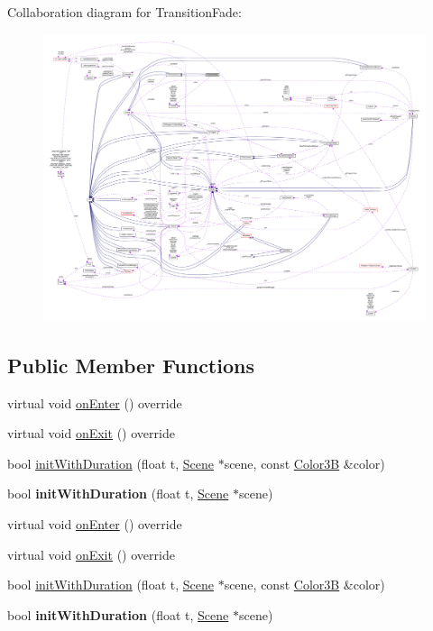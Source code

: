 Collaboration diagram for Transition\+Fade\+:
\nopagebreak
\begin{figure}[H]
\begin{center}
\leavevmode
\includegraphics[width=350pt]{classTransitionFade__coll__graph}
\end{center}
\end{figure}
\subsection*{Public Member Functions}
\begin{DoxyCompactItemize}
\item 
virtual void \hyperlink{classTransitionFade_aaeb601022c4d71c24e333fe1807f88d4}{on\+Enter} () override
\item 
virtual void \hyperlink{classTransitionFade_aa476da6459ad94c3fb3254a261fe3161}{on\+Exit} () override
\item 
bool \hyperlink{classTransitionFade_ac2caf085c6ebb62005f7c87a15f0920f}{init\+With\+Duration} (float t, \hyperlink{classScene}{Scene} $\ast$scene, const \hyperlink{structColor3B}{Color3B} \&color)
\item 
\mbox{\label{classTransitionFade_aa826bd554eb3c2566afebcbaff1cdea1}} 
bool {\bfseries init\+With\+Duration} (float t, \hyperlink{classScene}{Scene} $\ast$scene)
\item 
virtual void \hyperlink{classTransitionFade_a2fadd05a4c0d74b34b1530c7d7f07255}{on\+Enter} () override
\item 
virtual void \hyperlink{classTransitionFade_a84179a9a978c9ff2e302e913f7d90cc4}{on\+Exit} () override
\item 
bool \hyperlink{classTransitionFade_ac2caf085c6ebb62005f7c87a15f0920f}{init\+With\+Duration} (float t, \hyperlink{classScene}{Scene} $\ast$scene, const \hyperlink{structColor3B}{Color3B} \&color)
\item 
\mbox{\label{classTransitionFade_aa826bd554eb3c2566afebcbaff1cdea1}} 
bool {\bfseries init\+With\+Duration} (float t, \hyperlink{classScene}{Scene} $\ast$scene)
\end{DoxyCompactItemize}
